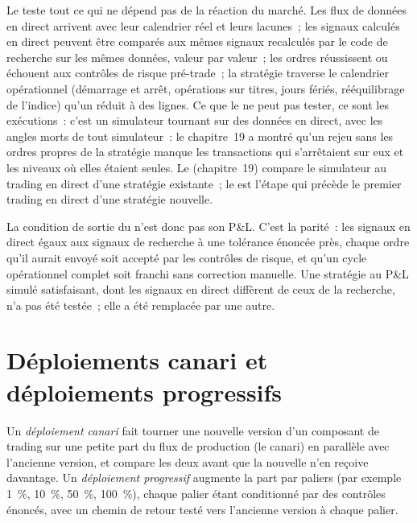 Le  teste tout ce qui ne dépend pas de la réaction du marché. Les flux de données en direct arrivent avec leur calendrier réel et leurs lacunes~; les signaux calculés
en direct peuvent être comparés aux mêmes signaux recalculés par le code de recherche sur les mêmes données, valeur par valeur~; les ordres réussissent ou échouent aux contrôles de risque
pré-trade~; la stratégie traverse le calendrier opérationnel (démarrage et arrêt, opérations sur titres, jours fériés, rééquilibrage de l'indice)
qu'un  réduit à des lignes. Ce que le  ne peut pas tester, ce sont les exécutions~: c'est un simulateur tournant sur des données en direct, avec les angles morts de tout simulateur~: le chapitre~19
a montré qu'un rejeu sans les ordres propres de la stratégie manque les transactions qui s'arrêtaient sur eux et les niveaux où elles étaient seules. Le 
(chapitre~19) compare le simulateur au trading en direct d'une stratégie existante~; le  est l'étape qui précède le premier trading en direct d'une stratégie nouvelle.

La condition de sortie du  n'est donc pas son P\&L. C'est la parité~: les signaux en direct égaux aux signaux de recherche à une tolérance énoncée près, chaque
ordre qu'il aurait envoyé soit accepté par les contrôles de risque, et qu'un cycle opérationnel complet soit franchi sans correction manuelle. Une stratégie au P\&L simulé satisfaisant, dont
les signaux en direct diffèrent de ceux de la recherche, n'a pas été testée~; elle a été remplacée par une autre.

\section{Déploiements canari et déploiements progressifs}

\begin{definition}\label{def:rs:live-experiments:canary}
Un \emph{déploiement canari} fait tourner une nouvelle version d'un composant de trading sur une petite part du flux de production (le canari) en parallèle
avec l'ancienne version, et compare les deux avant que la nouvelle n'en reçoive davantage. Un \emph{déploiement progressif} augmente la part par paliers (par exemple
1~\%, 10~\%, 50~\%, 100~\%), chaque palier étant conditionné par des contrôles énoncés, avec un chemin de retour testé vers l'ancienne version à chaque palier.
\end{definition}

